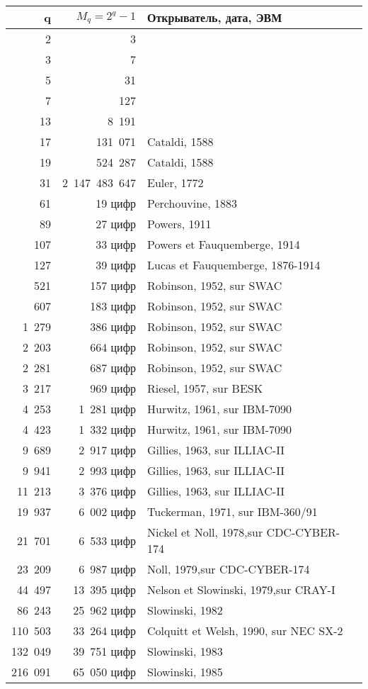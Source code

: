 \newpage

\begin{tabular}[t]{|r|r|l|}

\hline
q & $M_q=2^q-1$ & Открыватель, дата, ЭВМ \\
\hline
2 & 3 & \\
3 & 7 & \\
5 & 31 & \\
7 & 127 & \\
13 & 8\ 191 \\
17 & 131\ 071 & Cataldi, 1588 \\
19 & 524\ 287 & Cataldi, 1588 \\
31 & 2\ 147\ 483\ 647 & Euler, 1772 \\
61 & 19 цифр & Perchouvine, 1883 \\
89 & 27 цифр & Powers, 1911 \\
107 & 33 цифр & Powers et Fauquemberge, 1914 \\
127 & 39 цифр & Lucas et Fauquemberge, 1876-1914 \\
521 & 157 цифр & Robinson, 1952, sur SWAC \\
607 & 183 цифр & Robinson, 1952, sur SWAC \\
1\ 279 & 386 цифр & Robinson, 1952, sur SWAC \\
2\ 203 & 664 цифр & Robinson, 1952, sur SWAC \\
2\ 281 & 687 цифр & Robinson, 1952, sur SWAC \\
3\ 217 & 969 цифр & Riesel, 1957, sur BESK \\ 
4\ 253 & 1\ 281 цифр & Hurwitz, 1961, sur IBM-7090 \\
4\ 423 & 1\ 332 цифр & Hurwitz, 1961, sur IBM-7090 \\
9\ 689 & 2\ 917 цифр & Gillies, 1963, sur ILLIAC-II \\
9\ 941 & 2\ 993 цифр & Gillies, 1963, sur ILLIAC-II \\
11\ 213 & 3\ 376 цифр & Gillies, 1963, sur ILLIAC-II \\
19\ 937 & 6\ 002 цифр & Tuckerman, 1971, sur IBM-360/91 \\
21\ 701 & 6\ 533 цифр & Nickel et Noll, 1978,sur CDC-CYBER-174 \\
23\ 209 & 6\ 987 цифр & Noll, 1979,sur CDC-CYBER-174 \\
44\ 497 & 13\ 395 цифр & Nelson et Slowinski, 1979,sur CRAY-I \\
86\ 243 & 25\ 962 цифр & Slowinski, 1982 \\
110\ 503 & 33\ 264 цифр & Colquitt et Welsh, 1990, sur NEC SX-2 \\
132\ 049 & 39\ 751 цифр & Slowinski, 1983 \\
216\ 091 & 65\ 050 цифр & Slowinski, 1985 \\
\hline
\end{tabular}

